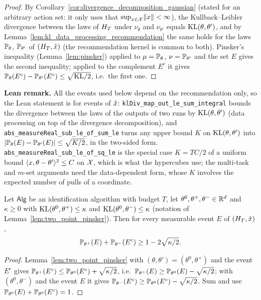 \begin{proof}
\leanok
{}
By Corollary~\ref{cor:divergence_decomposition_gaussian} (stated for an arbitrary action
set: it only uses that $\sup_{x\in\mathcal{X}}\lVert x \rVert < \infty$), the Kullback--Leibler divergence
between the laws of $H_T$ under $\nu_\theta$ and $\nu_{\theta'}$ equals
$\mathrm{KL}(\theta,\theta')$, and by Lemma~\ref{lem:kl_data_processing_recommendation} the same
holds for the laws $\mathbb{P}_\theta$, $\mathbb{P}_{\theta'}$ of $(H_T,\hat{x})$ (the recommendation
kernel is common to both). Pinsker's inequality (Lemma~\ref{lem:pinsker}) applied to
$\mu = \mathbb{P}_\theta$, $\nu = \mathbb{P}_{\theta'}$ and the set $E$ gives the second inequality;
applied to the complement $E^c$ it gives
$\mathbb{P}_\theta(E^c) - \mathbb{P}_{\theta'}(E^c) \le \sqrt{\mathrm{KL}/2}$, i.e.\ the first one.
\end{proof}

\textbf{Lean remark.} All the events used below depend on the recommendation only, so the Lean
statement is for events of $\hat{x}$: \texttt{klDiv\_map\_out\_le\_sum\_integral} bounds the
divergence between the laws of the outputs of two runs by $\mathrm{KL}(\theta,\theta')$ (data processing
on top of the divergence decomposition), and
\texttt{abs\_measureReal\_sub\_le\_of\_sum\_le} turns any upper bound $K$ on
$\mathrm{KL}(\theta,\theta')$ into $\lvert \mathbb{P}_\theta(E) - \mathbb{P}_{\theta'}(E) \rvert \le \sqrt{K/2}$, in the
two-sided form. \texttt{abs\_measureReal\_sub\_le\_of\_sq\_le} is the special case
$K = TC/2$ of a uniform bound $\langle x, \theta-\theta' \rangle^2 \le C$ on $\mathcal{X}$, which is what the
hypercubes use; the multi-task and $m$-set arguments need the data-dependent form, whose $K$
involves the expected number of pulls of a coordinate.

\begin{lemma}\label{lem:log_gains_three_point}
\leanok
{}
Let $\mathsf{Alg}$ be an identification algorithm with budget $T$, let
$\theta^0, \theta^+, \theta^- \in \mathbb{R}^d$ and $\kappa \ge 0$ with
$\mathrm{KL}(\theta^0,\theta^+) \le \kappa$ and $\mathrm{KL}(\theta^0,\theta^-) \le \kappa$ (notation of
Lemma~\ref{lem:two_point_pinsker}). Then for every measurable event $E$ of $(H_T,\hat{x})$,
\[
  \mathbb{P}_{\theta^+}(E) + \mathbb{P}_{\theta^-}(E^c) \ge 1 - 2\sqrt{\kappa/2} .
\]
\end{lemma}

\begin{proof}
\leanok
{}
Lemma~\ref{lem:two_point_pinsker} with $(\theta,\theta') = (\theta^0,\theta^+)$ and the event
$E^c$ gives $\mathbb{P}_{\theta^+}(E^c) \le \mathbb{P}_{\theta^0}(E^c) + \sqrt{\kappa/2}$, i.e.\
$\mathbb{P}_{\theta^+}(E) \ge \mathbb{P}_{\theta^0}(E) - \sqrt{\kappa/2}$; with
$(\theta^0,\theta^-)$ and the event $E$ it gives
$\mathbb{P}_{\theta^-}(E^c) \ge \mathbb{P}_{\theta^0}(E^c) - \sqrt{\kappa/2}$. Sum and use
$\mathbb{P}_{\theta^0}(E) + \mathbb{P}_{\theta^0}(E^c) = 1$.
\end{proof}

